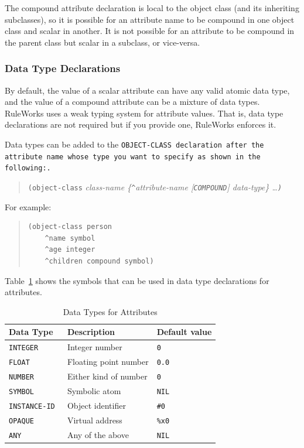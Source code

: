 The compound attribute declaration is local to the object
class (and its inheriting subclasses), so it is possible for
an attribute name to be compound in one object class and
scalar in another. It is not possible for an attribute to be
compound in the parent class but scalar in a subclass, or
vice-versa.

\subsubsection{Data Type Declarations}

By default, the value of a scalar attribute can have any
valid atomic data type, and the value of a compound attribute
can be a mixture of data types. RuleWorks uses a weak typing
system for attribute values. That is, data type declarations
are not required but if you provide one, RuleWorks enforces
it.

Data types can be added to the \tt{OBJECT-CLASS} declaration after
the attribute name whose type you want to specify as shown in
the following:.

\begin{quote}
  \verb|(object-class| \it{class-name} \{\verb|^|\it{attribute-name}
    [\verb|COMPOUND|] \it{data-type}\} \ldots \verb|)|
\end{quote}

For example:

\begin{quote}
\begin{verbatim}
(object-class person
    ^name symbol
    ^age integer
    ^children compound symbol)
\end{verbatim}
\end{quote}

Table~\ref{t:2-2} shows the symbols that can be used in data type
declarations for attributes.

\begin{table}[h]
  \centering
  \begin{tabular}{lll}
    \toprule
    Data Type & Description & Default value \\
    \midrule
    \tt{INTEGER}     & Integer number        & \tt{0} \\
    \tt{FLOAT}       & Floating point number & \tt{0.0} \\
    \tt{NUMBER}      & Either kind of number & \tt{0} \\
    \tt{SYMBOL}      & Symbolic atom         & \tt{NIL} \\
    \tt{INSTANCE-ID} & Object identifier     & \verb|#0| \\
    \tt{OPAQUE}      & Virtual address       & \verb|%x0| \\
    \tt{ANY}         & Any of the above      & \tt{NIL} \\  
    \bottomrule
  \end{tabular}
  \caption{Data Types for Attributes}
  \label{t:2-2}
\end{table}

